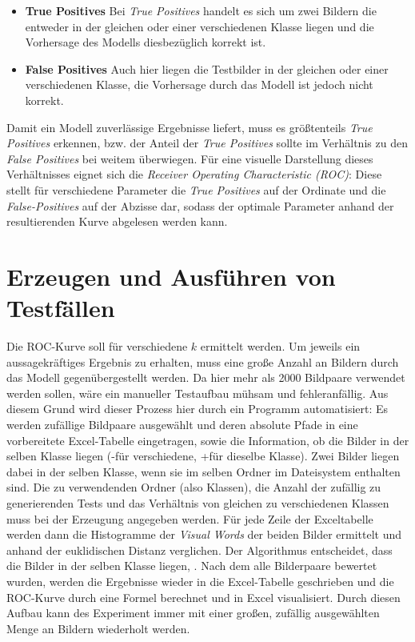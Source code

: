 \begin{itemize}
	\item \textbf{True Positives} Bei \textit{True Positives} handelt es sich um zwei Bildern die entweder in der gleichen oder einer verschiedenen Klasse liegen und die Vorhersage des Modells diesbezüglich korrekt ist.
	\item \textbf{False Positives} Auch hier liegen die Testbilder in der gleichen oder einer verschiedenen Klasse, die Vorhersage durch das Modell ist jedoch nicht korrekt.
\end{itemize}

Damit ein Modell zuverlässige Ergebnisse liefert, muss es größtenteils \textit{True Positives} erkennen, bzw. der Anteil der \textit{True Positives} sollte im Verhältnis zu den \textit{False Positives} bei weitem überwiegen. Für eine visuelle Darstellung dieses Verhältnisses eignet sich die \textit{Receiver Operating Characteristic (ROC)}: Diese stellt für verschiedene Parameter die \textit{True Positives} auf der Ordinate und die \textit{False-Positives} auf der Abzisse dar, sodass der optimale Parameter anhand der resultierenden Kurve abgelesen werden kann.

\section{Erzeugen und Ausführen von Testfällen}

Die ROC-Kurve soll für verschiedene $k$ ermittelt werden. Um jeweils ein aussagekräftiges Ergebnis zu erhalten, muss eine große Anzahl an Bildern durch das Modell gegenübergestellt werden. Da hier mehr als 2000 Bildpaare verwendet werden sollen, wäre ein manueller Testaufbau mühsam und fehleranfällig. Aus diesem Grund wird dieser Prozess hier durch ein Programm automatisiert: Es werden zufällige Bildpaare ausgewählt und deren absolute Pfade in eine vorbereitete Excel-Tabelle eingetragen, sowie die Information, ob die Bilder in der selben Klasse liegen (\glqq -\grqq für verschiedene, \glqq +\grqq für dieselbe Klasse). Zwei Bilder liegen dabei in der selben Klasse, wenn sie im selben Ordner im Dateisystem enthalten sind. Die zu verwendenden Ordner (also Klassen), die Anzahl der zufällig zu generierenden Tests und das Verhältnis von gleichen zu verschiedenen Klassen muss bei der Erzeugung angegeben werden. Für jede Zeile der Exceltabelle werden dann die Histogramme der \textit{Visual Words} der beiden Bilder ermittelt und anhand der euklidischen Distanz verglichen. Der Algorithmus entscheidet, dass die Bilder in der selben Klasse liegen, . Nach dem alle Bilderpaare bewertet wurden, werden die Ergebnisse wieder in die Excel-Tabelle geschrieben und die ROC-Kurve durch eine Formel berechnet und in Excel visualisiert. Durch diesen Aufbau kann des Experiment immer mit einer großen, zufällig ausgewählten Menge an Bildern wiederholt werden.

